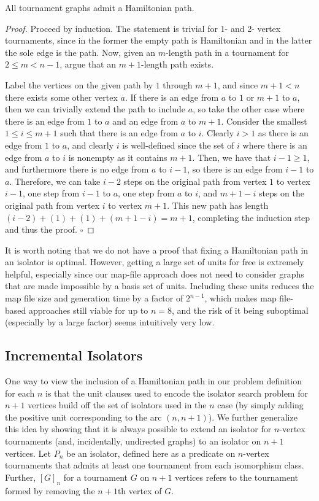 \documentclass[a4paper,UKenglish,cleveref, autoref, thm-restate]{lipics-v2021}
\begin{document}
\begin{theorem}
All tournament graphs admit a Hamiltonian path.
\end{theorem}

\begin{proof}
Proceed by induction.  The statement is trivial for 1- and 2- vertex tournaments, since in the former the empty path is Hamiltonian and in the latter the sole edge is the path.  Now, given an $m$-length path in a tournament for $2 \le m < n-1$, argue that an $m+1$-length path exists.

Label the vertices on the given path by $1$ through $m+1$, and since $m+1 < n$ there exists some other vertex $a$.  If there is an edge from $a$ to $1$ or $m+1$ to $a$, then we can trivially extend the path to include $a$, so take the other case where there is an edge from $1$ to $a$ and an edge from $a$ to $m+1$.  Consider the smallest $1 \le i \le m+1$ such that there is an edge from $a$ to $i$.  Clearly $i > 1$ as there is an edge from $1$ to $a$, and clearly $i$ is well-defined since the set of $i$ where there is an edge from $a$ to $i$ is nonempty as it contains $m+1$.  Then, we have that $i-1 \ge 1$, and furthermore there is no edge from $a$ to $i-1$, so there is an edge from $i-1$ to $a$.  Therefore, we can take $i-2$ steps on the original path from vertex $1$ to vertex $i-1$, one step from $i-1$ to $a$, one step from $a$ to $i$, and $m+1-i$ steps on the original path from vertex $i$ to vertex $m+1$.  This new path has length $(i-2) + (1) + (1) + (m+1-i) = m+1$, completing the induction step and thus the proof.  $\square$
\end{proof}

It is worth noting that we do not have a proof that fixing a Hamiltonian path in an isolator is optimal.  However, getting a large set of units for free is extremely helpful, especially since our map-file approach does not need to consider graphs that are made impossible by a basis set of units. Including these units reduces the map file size and generation time by a factor of $2^{n-1}$, which makes map file-based approaches still viable for up to $n = 8$, and the risk of it being suboptimal (especially by a large factor) seems intuitively very low.


\subsection{Incremental Isolators}
One way to view the inclusion of a Hamiltonian path in our problem definition for each $n$ is that the unit clauses used to encode the isolator search problem for $n+1$ vertices build off the set of isolators used in the $n$ case (by simply adding the positive unit corresponding to the arc $(n, n+1)$). We further generalize this idea by showing that it is always possible to extend an isolator for $n$-vertex tournaments (and, incidentally, undirected graphs) to an isolator on $n+1$ vertices. Let $P_n$ be an isolator, defined here as a predicate on $n$-vertex tournaments that admits at least one tournament from each isomorphism class. Further, $[G]_n$ for a tournament $G$ on $n+1$ vertices refers to the tournament formed by removing the $n+1$th vertex of $G$.
\end{document}
